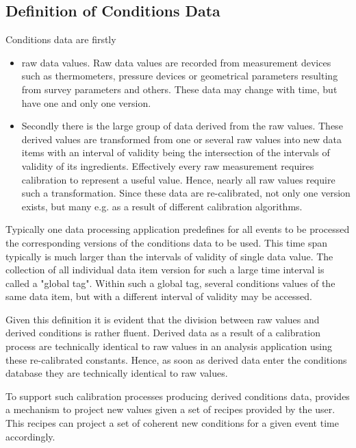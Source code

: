 \documentclass[10pt,a4paper]{article}
\begin{document}
\subsection{Definition of Conditions Data}
\label{subsec:ddcond-conditions-data}
\noindent
Conditions data are firstly
\begin{itemize}\itemcompact
\item raw data values. Raw data values are recorded from measurement 
      devices such as 
      thermometers, pressure devices or 
      geometrical parameters resulting
      from survey parameters and others.
      These data may change with time, but have one and only one version.
\item Secondly there is the large group of data derived from the raw values.
      These derived values are transformed from one or several raw values
      into new data items with an interval of validity being the
      intersection of the intervals of validity of its ingredients.
      Effectively every raw measurement requires calibration to represent
      a useful value. Hence, nearly all raw values require such a 
      transformation. Since these data are re-calibrated, not only one version
      exists, but many e.g. as a result of different calibration algorithms. 
\end{itemize}
Typically one data processing application predefines for all events 
to be processed the corresponding versions of the conditions data to be used.
This time span typically is much larger than the intervals of validity 
of single data value.
The collection of all individual data item version for such a large time interval
is called a "global tag".
Within such a global tag, several conditions values of the same data item, but 
with a different interval of validity may be accessed.

\noindent
Given this definition it is evident that the division between raw values 
and derived conditions is rather fluent. Derived data as a result of
a calibration process are technically identical to raw values in an
analysis application using these re-calibrated constants.
Hence, as soon as derived data enter the conditions database they are 
technically identical to raw values.

\noindent
To support such calibration processes producing derived conditions 
data, \DDC provides a mechanism to project new values given 
a set of recipes provided by the user. This recipes can project a 
set of coherent new conditions for a given event time accordingly.
\end{document}
